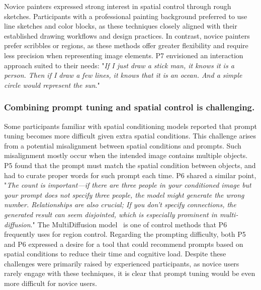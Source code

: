 Novice painters expressed strong interest in spatial control through rough sketches.
Participants with a professional painting background preferred to use line sketches and color blocks, as these techniques closely aligned with their established drawing workflows and design practices.
In contrast, novice painters prefer scribbles or regions, as these methods offer greater flexibility and require less precision when representing image elements.
P7 envisioned an interaction approach suited to their needs: "\emph{If I just draw a stick man, it knows it is a person. Then if I draw a few lines, it knows that it is an ocean. And a simple circle would represent the sun}."

\subsubsection{Combining prompt tuning and spatial control is challenging.}
Some participants familiar with spatial conditioning models reported that prompt tuning becomes more difficult given extra spatial conditions. 
This challenge arises from a potential misalignment between spatial conditions and prompts.
Such misalignment mostly occur when the intended image contains multiple objects. 
P5 found that the prompt must match the spatial condition between objects, and had to curate proper words for such prompt each time. 
P6 shared a similar point, "\emph{The count is important—if there are three people in your conditioned image but your prompt does not specify three people, the model might generate the wrong number. 
Relationships are also crucial; If you don’t specify connections, the generated result can seem disjointed, which is especially prominent in multi-diffusion}." 
The MultiDiffusion model~\cite{bar2023multidiffusion} is one of control methods that P6 frequently uses for region control.
Regarding the prompting difficulty, both P5 and P6 expressed a desire for a tool that could recommend prompts based on spatial conditions to reduce their time and cognitive load.
Despite these challenges were primarily raised by experienced participants, as novice users rarely engage with these techniques, it is clear that prompt tuning would be even more difficult for novice users.


